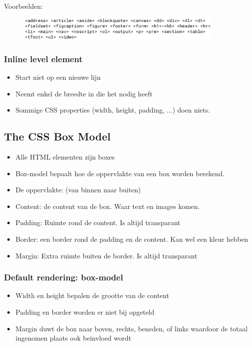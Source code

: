 \documentclass{article}
\begin{document}
Voorbeelden:\\


\begin{figure}[H]
    \includegraphics[width=0.9\textwidth]{img/Screenshot_20200212_144611.png}
\end{figure}




\subsubsection{Inline level element}
\begin{itemize}
    \item Start niet op een nieuwe lijn 
    \item Neemt enkel de breedte in die het nodig heeft
    \item Sommige CSS properties (width, height, padding, ...) doen niets.  
\end{itemize}

\subsection{The CSS Box Model}
\begin{itemize}
    \item Alle HTML elementen zijn boxes 
    \item Box-model bepaalt hoe de oppervlakte van een box worden berekend. 
    \item De oppervlakte: (van binnen naar buiten) 
    \item Content: de content van de box. Waar text en images komen.
    \item Padding: Ruimte rond de content. Is altijd transparant 
    \item Border: een border rond de padding en de content. Kan wel een kleur hebben 
    \item Margin: Extra ruimte buiten de border. Is altijd transparant
\end{itemize}

\subsubsection{Default rendering: box-model}
\begin{itemize}
    \item Width en height bepalen de grootte van de content
    \item Padding en border worden er niet bij opgeteld
    \item Margin duwt de box naar boven, rechts, beneden, of links waardoor de totaal ingenomen plaats ook beinvloed wordt
\end{itemize}
\end{document}
